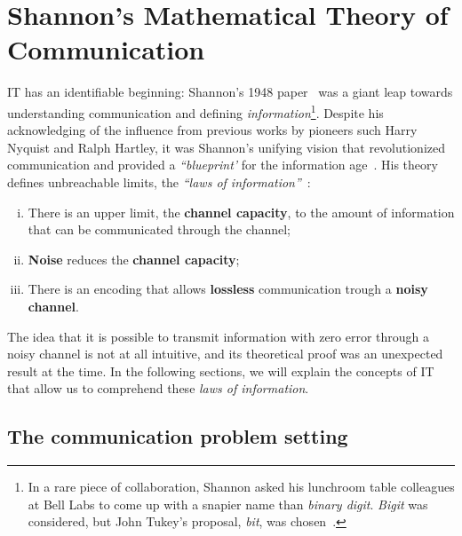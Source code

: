 \section{Shannon's Mathematical Theory of Communication}

\acf{IT} has an identifiable beginning: Shannon's 1948 paper~ was a giant leap towards understanding communication and defining \emph{information}\footnote{In a rare piece of collaboration, Shannon asked his lunchroom table colleagues at Bell Labs to come up with a snapier name than \emph{binary digit}. \emph{Bigit} was considered, but John Tukey's proposal, \emph{bit}, was chosen~\cite{soni:2017}.}. Despite his acknowledging of the influence from previous works by pioneers such Harry Nyquist and Ralph Hartley, it was Shannon's unifying vision that revolutionized communication and provided a \emph{``blueprint'} for the information age~\cite{aftab:2001}. His theory defines unbreachable limits, the \emph{``laws of information''}~\cite{stone:2015}:

	\begin{enumerate}[i.]\label{shannon_laws}
		\item There is an upper limit, the \textbf{channel capacity}, to the amount of information that can be communicated through the channel;
		\item \textbf{Noise} reduces the \textbf{channel capacity};
		\item There is an encoding that allows \textbf{lossless} communication trough a \textbf{noisy channel}.
	\end{enumerate}

The idea that it is possible to transmit information with zero error through a noisy channel is not at all intuitive, and its theoretical proof was an unexpected result at the time. In the following sections, we will explain the concepts of \ac{IT} that allow us to comprehend these \emph{laws of information}.

\subsection{The communication problem setting}\label{sec:communication_problem_setting}


